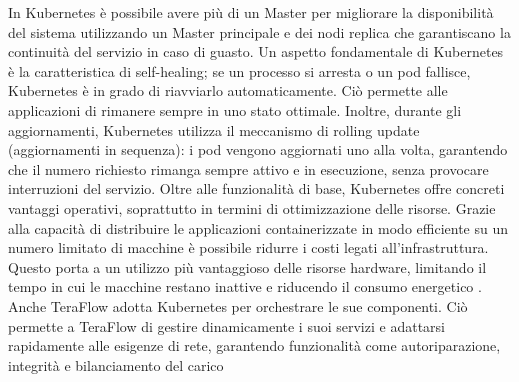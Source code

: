 In Kubernetes è possibile avere più di un Master per migliorare la disponibilità del sistema utilizzando un Master principale e dei nodi replica che garantiscano la continuità del servizio in caso di guasto.
\newline Un aspetto fondamentale di Kubernetes è la caratteristica di self-healing; se un processo si arresta o un pod fallisce, Kubernetes è in grado di riavviarlo automaticamente. 
Ciò permette alle applicazioni di rimanere sempre in uno stato ottimale.
Inoltre, durante gli aggiornamenti, Kubernetes utilizza il meccanismo di rolling update (aggiornamenti in sequenza): 
i pod vengono aggiornati uno alla volta, garantendo che il numero richiesto rimanga sempre attivo e in esecuzione, senza provocare interruzioni del servizio. 
\newline Oltre alle funzionalità di base, Kubernetes offre concreti vantaggi operativi, soprattutto in termini di ottimizzazione delle risorse. 
Grazie alla capacità di distribuire le applicazioni containerizzate in modo efficiente su un numero limitato di macchine è possibile ridurre i costi legati all'infrastruttura. 
Questo porta a un utilizzo più vantaggioso delle risorse hardware, limitando il tempo in cui le macchine restano inattive e riducendo il consumo energetico \cite{bookub}.
Anche TeraFlow adotta Kubernetes per orchestrare le sue componenti. 
Ciò permette a TeraFlow di gestire dinamicamente i suoi servizi e adattarsi rapidamente alle esigenze di rete, garantendo funzionalità come autoriparazione, integrità e bilanciamento del carico \cite{D14}

